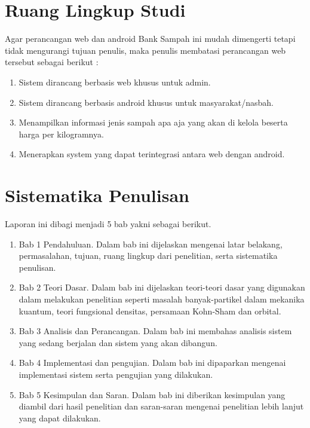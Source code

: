 \section{Ruang Lingkup Studi}
Agar perancangan web dan android Bank Sampah ini  mudah  dimengerti tetapi tidak mengurangi tujuan penulis, maka penulis membatasi perancangan web tersebut sebagai berikut :
\begin{enumerate}
\item Sistem dirancang berbasis web khusus untuk admin.
\item Sistem dirancang berbasis android khusus untuk masyarakat/nasbah.
\item Menampilkan informasi jenis sampah apa aja yang akan di kelola beserta harga per kilogramnya.
\item Menerapkan system yang dapat terintegrasi antara web dengan android.
\end{enumerate}

\section{Sistematika Penulisan}
Laporan ini dibagi menjadi 5 bab yakni sebagai berikut.
\begin{enumerate}
\item Bab 1 Pendahuluan. Dalam bab ini dijelaskan mengenai latar belakang, permasalahan, tujuan, ruang lingkup dari penelitian, serta sistematika penulisan.
\item Bab 2 Teori Dasar. Dalam bab ini dijelaskan teori-teori dasar yang digunakan dalam melakukan penelitian seperti masalah banyak-partikel dalam mekanika kuantum, teori fungsional densitas, persamaan Kohn-Sham dan orbital.
\item Bab 3 Analisis dan Perancangan. Dalam bab ini membahas analisis sistem yang sedang berjalan dan sistem yang akan dibangun.  
\item Bab 4 Implementasi dan pengujian. Dalam bab ini dipaparkan mengenai implementasi sistem serta pengujian yang dilakukan.  
\item Bab 5 Kesimpulan dan Saran. Dalam bab ini diberikan kesimpulan yang diambil dari hasil penelitian dan saran-saran mengenai penelitian lebih lanjut yang dapat dilakukan.
\end{enumerate}


